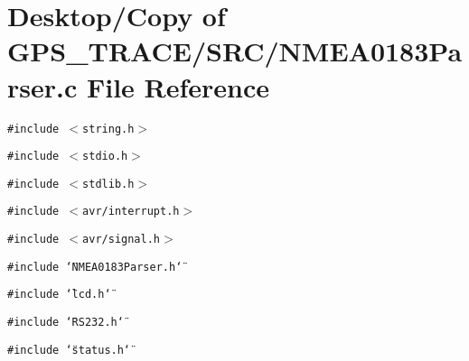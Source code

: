 \section{Desktop/Copy of GPS\_\-TRACE/SRC/NMEA0183Parser.c File Reference}
\label{_n_m_e_a0183_parser_8c}
{\tt \#include $<$string.h$>$}\par
{\tt \#include $<$stdio.h$>$}\par
{\tt \#include $<$stdlib.h$>$}\par
{\tt \#include $<$avr/interrupt.h$>$}\par
{\tt \#include $<$avr/signal.h$>$}\par
{\tt \#include \char`\"{}NMEA0183Parser.h\char`\"{}}\par
{\tt \#include \char`\"{}lcd.h\char`\"{}}\par
{\tt \#include \char`\"{}RS232.h\char`\"{}}\par
{\tt \#include \char`\"{}status.h\char`\"{}}\par


